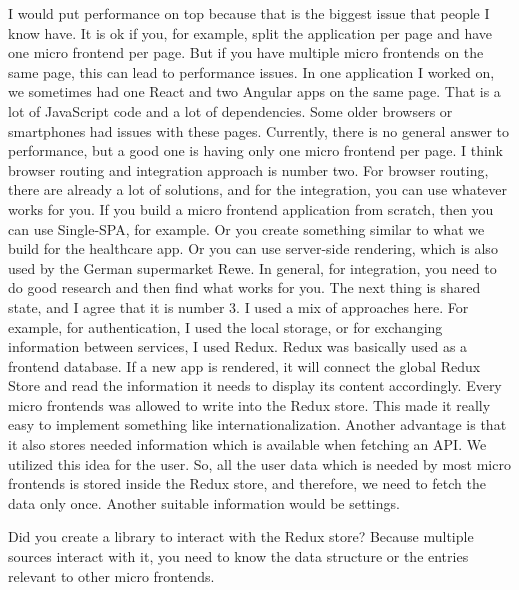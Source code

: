 \begin{description}
    \IvanJovanovic I would put performance on top because that is the biggest issue that people I know have. It is ok if you, for example, split the application per page and have one micro frontend per page. But if you have multiple micro frontends on the same page, this can lead to performance issues. In one application I worked on, we sometimes had one React and two Angular apps on the same page. That is a lot of JavaScript code and a lot of dependencies. Some older browsers or smartphones had issues with these pages. Currently, there is no general answer to performance, but a good one is having only one micro frontend per page.
    I think browser routing and integration approach is number two. For browser routing, there are already a lot of solutions, and for the integration, you can use whatever works for you. If you build a micro frontend application from scratch, then you can use Single-SPA, for example. Or you create something similar to what we build for the healthcare app. Or you can use server-side rendering, which is also used by the German supermarket Rewe.
    In general, for integration, you need to do good research and then find what works for you.
    The next thing is shared state, and I agree that it is number 3. I used a mix of approaches here. For example, for authentication, I used the local storage, or for exchanging information between services, I used Redux. Redux was basically used as a frontend database. If a new app is rendered, it will connect the global Redux Store and read the information it needs to display its content accordingly. Every micro frontends was allowed to write into the Redux store. This made it really easy to implement something like internationalization. Another advantage is that it also stores needed information which is available when fetching an API. We utilized this idea for the user. So, all the user data which is needed by most micro frontends is stored inside the Redux store, and therefore, we need to fetch the data only once. Another suitable information would be settings.

    \NicoVogel Did you create a library to interact with the Redux store? Because multiple sources interact with it, you need to know the data structure or the entries relevant to other micro frontends.


\end{description}

